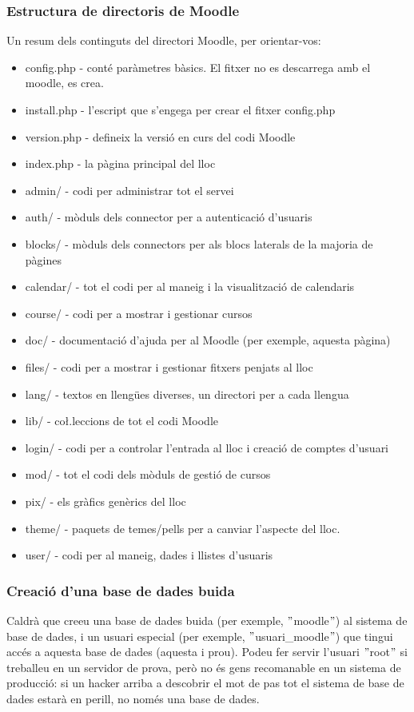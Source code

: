 \documentclass[a4paper]{report}  %
\begin{document}
\subsubsection{Estructura de directoris de Moodle}
Un resum dels continguts del directori Moodle, per orientar-vos: 
\begin{itemize}
\item config.php - conté paràmetres bàsics. El fitxer no es descarrega amb el moodle, es crea. 
\item install.php - l'escript que s'engega per crear el fitxer config.php 
\item version.php - defineix la versió en curs del codi Moodle 
\item index.php - la pàgina principal del lloc 
\item admin/ - codi per administrar tot el servei 
\item auth/ - mòduls dels connector per a autenticació d'usuaris 
\item blocks/ - mòduls dels connectors per als blocs laterals de la majoria de pàgines 
\item calendar/ - tot el codi per al maneig i la visualització de calendaris 
\item course/ - codi per a mostrar i gestionar cursos 
\item doc/ - documentació d'ajuda per al Moodle (per exemple, aquesta pàgina) 
\item files/ - codi per a mostrar i gestionar fitxers penjats al lloc 
\item lang/ - textos en llengües diverses, un directori per a cada llengua 
\item lib/ - co\l.leccions de tot el codi Moodle 
\item login/ - codi per a controlar l'entrada al lloc i creació de comptes d'usuari 
\item mod/ - tot el codi dels mòduls de gestió de cursos 
\item pix/ - els gràfics genèrics del lloc 
\item theme/ - paquets de temes/pells per a canviar l'aspecte del lloc. 
\item user/ - codi per al maneig, dades i llistes d'usuaris 
\end{itemize}
\subsubsection{Creació d'una base de dades buida}
Caldrà que creeu una base de dades buida (per exemple, $"$moodle$"$) al sistema de base de dades, i un usuari especial (per exemple, $"$usuari\_moodle$"$) que tingui accés a aquesta base de dades (aquesta i prou). Podeu fer servir l'usuari $"$root$"$ si treballeu en un servidor de prova, però no és gens recomanable en un sistema de producció: si un hacker arriba a descobrir el mot de pas tot el sistema de base de dades estarà en perill, no només una base de dades.
\end{document}
